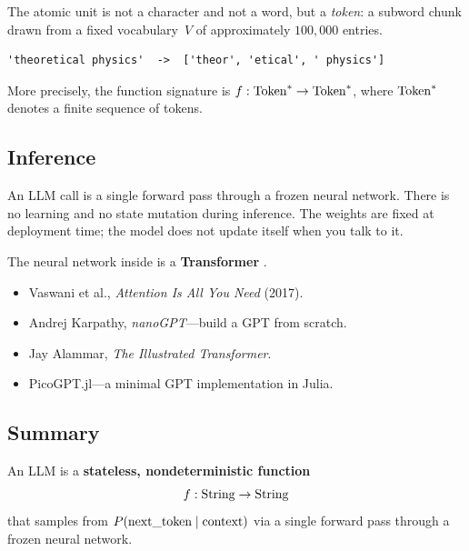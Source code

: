 The atomic unit is not a character and not a word, but a \emph{token}:
a subword chunk drawn from a fixed vocabulary~$V$ of approximately
$100{,}000$ entries.

\begin{example}[Tokenisation]
  \begin{lstlisting}
'theoretical physics'  ->  ['theor', 'etical', ' physics']
  \end{lstlisting}
\end{example}

More precisely, the function signature is
$f : \mathrm{Token}^* \to \mathrm{Token}^*$,
where $\mathrm{Token}^*$ denotes a finite sequence of tokens.

\subsection{Inference}

An LLM call is a single forward pass through a frozen neural
network.  There is no learning and no state mutation during
inference.  The weights are fixed at deployment time; the model does not
update itself when you talk to it.

The neural network inside is a \textbf{Transformer}
\cite{vaswani2017attention}.

\begin{greybox}
  \begin{itemize}
    \item Vaswani et al., \emph{Attention Is All You Need} (2017).
    \item Andrej Karpathy, \emph{nanoGPT}---build a GPT from scratch.
    \item Jay Alammar, \emph{The Illustrated Transformer}.
    \item PicoGPT.jl---a minimal GPT implementation in Julia.
  \end{itemize}
\end{greybox}

\subsection{Summary}

\begin{keyresult}
  An LLM is a \textbf{stateless, nondeterministic function}
  \[
    f : \mathrm{String} \to \mathrm{String}
  \]
  that samples from $P(\text{next\_token} \mid \text{context})$
  via a single forward pass through a frozen neural network.
\end{keyresult}
